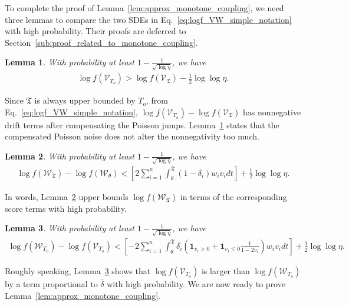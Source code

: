 \documentclass[11pt]{article}
\newcommand{\bdelta}{\bar{\delta}}
\newcommand{\stopT}{{\boldsymbol{\mathfrak{T}}}}
\newcommand{\To}{{T_o}}
\newcommand{\rV}{\mathscr{V}}
\newcommand{\rW}{\mathscr{W}}
\theoremstyle{named}
\theoremstyle{plain}
\newtheorem{lemma}{Lemma}
\newcommand{\brackets}[1]{\left[ #1 \right]}
\newcommand{\parenth}[1]{\left( #1 \right)}
\begin{document}
To complete the proof of Lemma~\ref{lem:approx_monotone_coupling}, we need three lemmas to compare the two SDEs in Eq.~\eqref{eq:logf_VW_simple_notation} with high probability. Their proofs are deferred to Section~\ref{sub:proof_related_to_monotone_coupling}.
\begin{lemma}
  \label{lem:logfV_lower_bound}
  With probability at least $1 - \frac{1}{\sqrt{\log \eta}}$, we have
  \begin{align*}
    \log f (\rV_{\To}) >  \log f (\rV_{\stopT}) - \frac{1}{2} \log\log \eta.
  \end{align*}
\end{lemma}
Since $\stopT$ is always upper bounded by $\To$, from Eq.~\eqref{eq:logf_VW_simple_notation}, $\log f (\rV_{\To}) -  \log f (\rV_{\stopT})$ has nonnegative drift terms after compensating the Poisson jumps. Lemma~\ref{lem:logfV_lower_bound} states that the compensated Poisson noise does not alter the nonnegativity too much.  
\begin{lemma}
  \label{lem:wivi_bound}
  With probability at least $1 - \frac{1}{\sqrt{\log \eta}}$, we have
  \begin{align*}
    \log f (\rW_{\stopT}) -  \log f (\rW_{\theta}) < \brackets{2 \sum_{i=1}^n \int_\theta^\stopT   (1-\delta_i) w_i v_i dt } + \frac{1}{2} \log\log \eta.
  \end{align*}
\end{lemma}
In words, Lemma~\ref{lem:wivi_bound} upper bounds $\log f (\rW_{\stopT})$ in terms of the corresponding score terms with high probability.  
\begin{lemma}
  \label{lem:log_diff_bound}
  With probability at least $1-\frac{1}{\sqrt{\log \eta}}$, we have 
  \begin{align*}
    \log f(\rW_\To) - \log f(\rV_\To) < \brackets{- 2 \sum_{i=1}^n \int_\theta^{\stopT} \delta_i \parenth{\mathbf{1}_{v_i > 0} + \mathbf{1}_{v_i \leq 0} \frac{1}{1-2v_i} } w_i v_i  dt } + \frac12 \log\log \eta. 
  \end{align*}
\end{lemma}
Roughly speaking, Lemma~\ref{lem:log_diff_bound} shows that $\log f(\rV_\To)$ is larger than $\log f(\rW_\To)$ by a term proportional to $\bdelta$ with high probability. We are now ready to prove Lemma~\ref{lem:approx_monotone_coupling}. 
\end{document}
